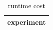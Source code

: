 \begin{table}[h]
\centering
\begin{tabular}{|c|}
\hline
experiment \\ \hline
\hline
\end{tabular}
\caption{runtime cost}
\label{tab:T15}
\end{table}
